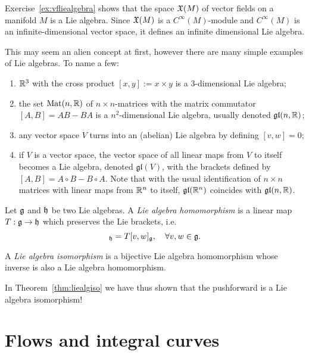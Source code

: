\begin{example}
  Exercise~\ref{ex:vfliealgebra} shows that the space $\mathfrak{X}(M)$ of vector fields on a manifold $M$ is a Lie algebra.
  Since $\mathfrak{X}(M)$ is a $C^\infty(M)$-module and $C^\infty(M)$ is an infinite-dimensional vector space, it defines an infinite dimensional Lie algebra.

  This may seem an alien concept at first, however there are many simple examples of Lie algebras. To name a few:
  \begin{enumerate}
    \item $\mathbb{R}^3$ with the cross product $[x,y]:=x\times y$ is a $3$-dimensional Lie algebra;
    \item the set $\mathrm{Mat}(n, \mathbb{R})$ of $n\times n$-matrices with the matrix commutator $[A,B] = AB-BA$ is a $n^2$-dimensional Lie algebra, usually denoted $\mathfrak{gl}(n, \mathbb{R})$;
    \item any vector space $V$ turns into an (abelian) Lie algebra by defining $[v,w]=0$;
    \item if $V$ is a vector space, the vector space of all linear maps from $V$ to itself becomes a Lie algebra, denoted $\mathfrak{gl}(V)$, with the brackets defined by $[A,B] = A\circ B-B\circ A$. Note that with the usual identification of $n\times n$ matrices with linear maps from $\mathbb{R}^n$ to itself, $\mathfrak{gl}(\mathbb{R}^n)$ coincides with $\mathfrak{gl}(n, \mathbb{R})$.
  \end{enumerate}
\end{example}

\begin{definition}
  Let $\mathfrak{g}$ and $\mathfrak{h}$ be two Lie algebras. A \emph{Lie algebra homomorphism} is a linear map $T:\mathfrak{g}\to\mathfrak{h}$ which preserves the Lie brackets, i.e.
  \begin{equation}
    [Tv, Tw]_\fh = T[v,w]_\fg, \quad \forall v,w\in\fg.
  \end{equation}

  A \emph{Lie algebra isomorphism} is a bijective Lie algebra homomorphism whose inverse is also a Lie algebra homomorphism.
\end{definition}

In Theorem~\ref{thm:liealgiso} we have thus shown that the pushforward is a Lie algebra isomorphism!

\section{Flows and integral curves}

